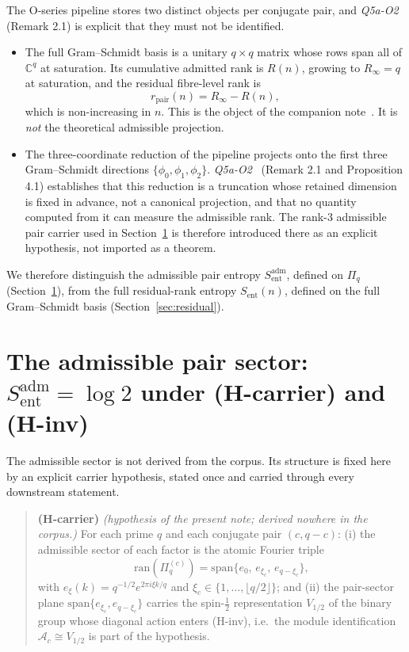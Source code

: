 \documentclass[11pt]{article}
\newcommand{\ran}{\mathrm{ran}}
\newcommand{\Sent}{S_{\mathrm{ent}}}
\newcommand{\Sadm}{S_{\mathrm{ent}}^{\mathrm{adm}}}
\newcommand{\rpair}{r_{\mathrm{pair}}}
\begin{document}
    The O-series pipeline stores two distinct objects per conjugate pair, and
    \emph{Q5a-O2}~\cite{Beau2026q5ao2} (Remark 2.1) is explicit that they must not be identified.

    \begin{itemize}
      \item The full Gram--Schmidt basis is a unitary $q\times q$ matrix whose rows span all of
      $\mathbb{C}^q$ at saturation.
      Its cumulative admitted rank is $R(n)$, growing to $R_\infty=q$ at saturation, and
      the residual fibre-level rank is
      \[
        \rpair(n) = R_\infty - R(n),
      \]
      which is non-increasing in $n$.
      This is the object of the companion note~\cite{Beau2026entnote}.
      It is \emph{not} the theoretical admissible projection.
      \item The three-coordinate reduction of the pipeline projects onto the first three
      Gram--Schmidt directions $\{\phi_0,\phi_1,\phi_2\}$.
      \emph{Q5a-O2}~\cite{Beau2026q5ao2} (Remark 2.1 and Proposition 4.1) establishes that this
      reduction is a truncation whose retained dimension is fixed in advance, not a canonical
      projection, and that no quantity computed from it can measure the admissible rank.
      The rank-3 admissible pair carrier used in Section~\ref{sec:adm} is therefore introduced
      there as an explicit hypothesis, not imported as a theorem.
    \end{itemize}

    We therefore distinguish the admissible pair entropy $\Sadm$, defined on $\Pi_q$
    (Section~\ref{sec:adm}), from the full residual-rank entropy $\Sent(n)$, defined on the
    full Gram--Schmidt basis (Section~\ref{sec:residual}).

  \section{The admissible pair sector: \texorpdfstring{$\Sadm=\log 2$}{S=log 2} under (H-carrier) and (H-inv)}
    \label{sec:adm}

    The admissible sector is not derived from the corpus.
    Its structure is fixed here by an explicit carrier hypothesis, stated once and carried
    through every downstream statement.

    \begin{quote}
      \textbf{(H-carrier)} \emph{(hypothesis of the present note; derived nowhere in the
      corpus.)}
      For each prime $q$ and each conjugate pair $(c, q-c)$: (i) the admissible sector of
      each factor is the atomic Fourier triple
      \[
        \ran(\Pi_q^{(c)}) = \mathrm{span}\{e_0,\, e_{\xi_c},\, e_{q-\xi_c}\},
      \]
      with $e_\xi(k)=q^{-1/2}e^{2\pi i\xi k/q}$ and $\xi_c\in\{1,\dots,\lfloor q/2\rfloor\}$;
      and (ii) the pair-sector plane $\mathrm{span}\{e_{\xi_c}, e_{q-\xi_c}\}$ carries the
      spin-$\tfrac12$ representation $V_{1/2}$ of the binary group whose diagonal action
      enters (H-inv), i.e.\ the module identification $\mathcal{A}_c \cong V_{1/2}$ is part
      of the hypothesis.
    \end{quote}
\end{document}
